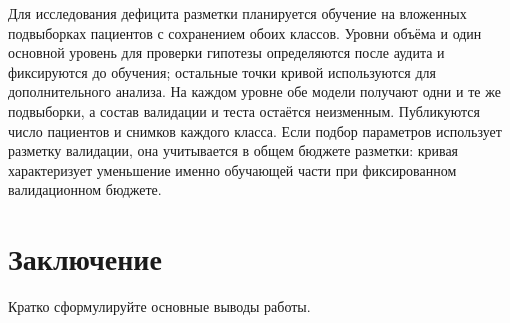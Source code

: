 \documentclass{misisarticle}
\begin{document}
Для исследования дефицита разметки планируется обучение на вложенных подвыборках пациентов с сохранением обоих классов. Уровни объёма и один основной уровень для проверки гипотезы определяются после аудита и фиксируются до обучения; остальные точки кривой используются для дополнительного анализа. На каждом уровне обе модели получают одни и те же подвыборки, а состав валидации и теста остаётся неизменным. Публикуются число пациентов и снимков каждого класса. Если подбор параметров использует разметку валидации, она учитывается в общем бюджете разметки: кривая характеризует уменьшение именно обучающей части при фиксированном валидационном бюджете.


\section{Заключение}

Кратко сформулируйте основные выводы работы.
\end{document}
